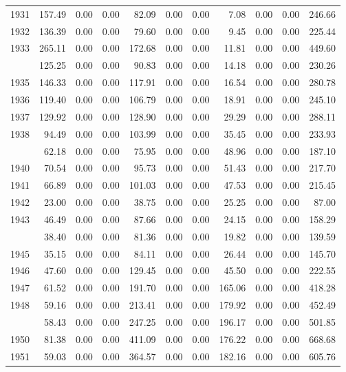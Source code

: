 \begin{longtable}[t]{rrrrrrrrrrr}
1931 & 157.49 & 0.00 & 0.00 & 82.09 & 0.00 & 0.00 & 7.08 & 0.00 & 0.00 & 246.66\\
1932 & 136.39 & 0.00 & 0.00 & 79.60 & 0.00 & 0.00 & 9.45 & 0.00 & 0.00 & 225.44\\
1933 & 265.11 & 0.00 & 0.00 & 172.68 & 0.00 & 0.00 & 11.81 & 0.00 & 0.00 & 449.60\\
\addlinespace
1934 & 125.25 & 0.00 & 0.00 & 90.83 & 0.00 & 0.00 & 14.18 & 0.00 & 0.00 & 230.26\\
1935 & 146.33 & 0.00 & 0.00 & 117.91 & 0.00 & 0.00 & 16.54 & 0.00 & 0.00 & 280.78\\
1936 & 119.40 & 0.00 & 0.00 & 106.79 & 0.00 & 0.00 & 18.91 & 0.00 & 0.00 & 245.10\\
1937 & 129.92 & 0.00 & 0.00 & 128.90 & 0.00 & 0.00 & 29.29 & 0.00 & 0.00 & 288.11\\
1938 & 94.49 & 0.00 & 0.00 & 103.99 & 0.00 & 0.00 & 35.45 & 0.00 & 0.00 & 233.93\\
\addlinespace
1939 & 62.18 & 0.00 & 0.00 & 75.95 & 0.00 & 0.00 & 48.96 & 0.00 & 0.00 & 187.10\\
1940 & 70.54 & 0.00 & 0.00 & 95.73 & 0.00 & 0.00 & 51.43 & 0.00 & 0.00 & 217.70\\
1941 & 66.89 & 0.00 & 0.00 & 101.03 & 0.00 & 0.00 & 47.53 & 0.00 & 0.00 & 215.45\\
1942 & 23.00 & 0.00 & 0.00 & 38.75 & 0.00 & 0.00 & 25.25 & 0.00 & 0.00 & 87.00\\
1943 & 46.49 & 0.00 & 0.00 & 87.66 & 0.00 & 0.00 & 24.15 & 0.00 & 0.00 & 158.29\\
\addlinespace
1944 & 38.40 & 0.00 & 0.00 & 81.36 & 0.00 & 0.00 & 19.82 & 0.00 & 0.00 & 139.59\\
1945 & 35.15 & 0.00 & 0.00 & 84.11 & 0.00 & 0.00 & 26.44 & 0.00 & 0.00 & 145.70\\
1946 & 47.60 & 0.00 & 0.00 & 129.45 & 0.00 & 0.00 & 45.50 & 0.00 & 0.00 & 222.55\\
1947 & 61.52 & 0.00 & 0.00 & 191.70 & 0.00 & 0.00 & 165.06 & 0.00 & 0.00 & 418.28\\
1948 & 59.16 & 0.00 & 0.00 & 213.41 & 0.00 & 0.00 & 179.92 & 0.00 & 0.00 & 452.49\\
\addlinespace
1949 & 58.43 & 0.00 & 0.00 & 247.25 & 0.00 & 0.00 & 196.17 & 0.00 & 0.00 & 501.85\\
1950 & 81.38 & 0.00 & 0.00 & 411.09 & 0.00 & 0.00 & 176.22 & 0.00 & 0.00 & 668.68\\
1951 & 59.03 & 0.00 & 0.00 & 364.57 & 0.00 & 0.00 & 182.16 & 0.00 & 0.00 & 605.76\\

\end{longtable}
